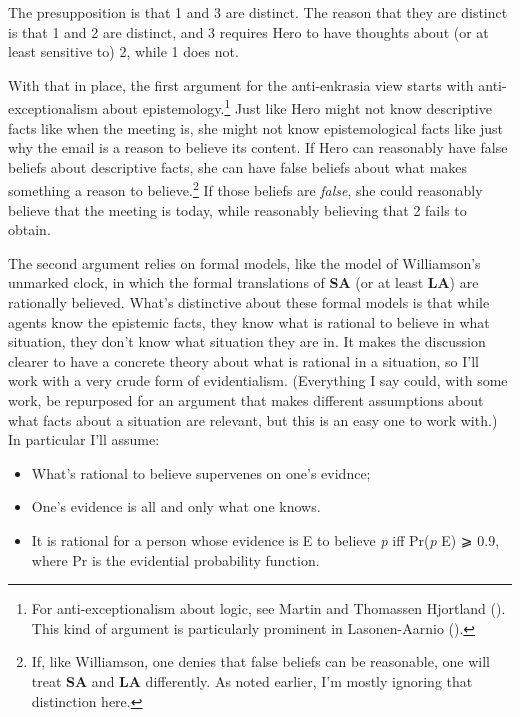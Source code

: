 \documentclass[
  11pt,
  letterpaper,
  DIV=11,
  numbers=noendperiod,
  twoside]{scrartcl}
\providecommand{\tightlist}{%
  \setlength{\itemsep}{0pt}\setlength{\parskip}{0pt}}
\begin{document}
The presupposition is that 1 and 3 are distinct. The reason that they
are distinct is that 1 and 2 are distinct, and 3 requires Hero to have
thoughts about (or at least sensitive to) 2, while 1 does not.

With that in place, the first argument for the anti-enkrasia view starts
with anti-exceptionalism about epistemology.\footnote{For
  anti-exceptionalism about logic, see Martin and Thomassen Hjortland
  (). This kind of argument is
  particularly prominent in Lasonen-Aarnio
  ().} Just like Hero might not
know descriptive facts like when the meeting is, she might not know
epistemological facts like just why the email is a reason to believe its
content. If Hero can reasonably have false beliefs about descriptive
facts, she can have false beliefs about what makes something a reason to
believe.\footnote{If, like Williamson, one denies that false beliefs can
  be reasonable, one will treat \textbf{SA} and \textbf{LA} differently.
  As noted earlier, I'm mostly ignoring that distinction here.} If those
beliefs are \emph{false}, she could reasonably believe that the meeting
is today, while reasonably believing that 2 fails to obtain.

The second argument relies on formal models, like the model of
Williamson's unmarked clock, in which the formal translations of
\textbf{SA} (or at least \textbf{LA}) are rationally believed. What's
distinctive about these formal models is that while agents know the
epistemic facts, they know what is rational to believe in what
situation, they don't know what situation they are in. It makes the
discussion clearer to have a concrete theory about what is rational in a
situation, so I'll work with a very crude form of evidentialism.
(Everything I say could, with some work, be repurposed for an argument
that makes different assumptions about what facts about a situation are
relevant, but this is an easy one to work with.) In particular I'll
assume:

\begin{itemize}
\tightlist
\item
  What's rational to believe supervenes on one's evidnce;
\item
  One's evidence is all and only what one knows.
\item
  It is rational for a person whose evidence is E to believe \emph{p}
  iff Pr(\emph{p} \textbar{} E) ⩾ 0.9, where Pr is the evidential
  probability function.
\end{itemize}
\end{document}
